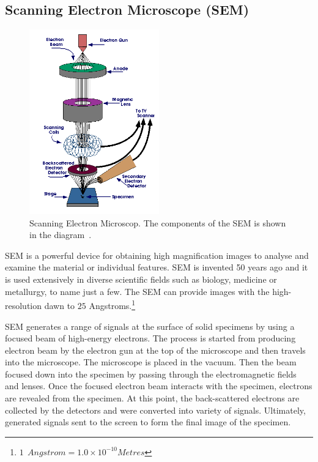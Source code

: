 \documentclass[12pt,a4paper,titlepage]{report}
\begin{document}
\subsection{Scanning Electron Microscope (\ac*{SEM})}\label{sem}



\begin{figure}
  \begin{center}
    \includegraphics[width=0.5\textwidth]{SEM}
  \caption{Scanning Electron Microscop. The components of the \ac*{SEM} is shown 
in the diagram~\citep{Doe:2014Jan:Online}.}
  \label{SEM}
\end{center}
\end{figure}


\ac*{SEM} is a powerful device for obtaining high magnification images to analyse and examine
 the material or individual features. \ac*{SEM} is invented 50 years ago and it is used extensively 
in diverse scientific fields such as biology, medicine or metallurgy,  to name just a few. The \ac*{SEM} can 
provide images with the high-resolution dawn to $25$ Angstroms.\footnote{$1 ~\ Angstrom =
1.0 \times 10^{-10} Metres$}%



\ac*{SEM} generates a range of signals at the surface of solid specimens by using a focused beam
 of high-energy electrons. The process is started from producing electron beam by the electron gun 
at the top of the microscope and then travels into the microscope. The microscope is placed in the
 vacuum. Then the beam focused down into the specimen by passing through the electromagnetic
 fields and lenses. Once the focused electron beam interacts with the specimen, electrons are revealed 
from the specimen. At this point, the back-scattered electrons are collected by the detectors and were 
converted into variety of signals. Ultimately, generated signals sent to the screen to form the final image 
of the specimen\citep{Doe:2014Jan:Online}. 
\end{document}
